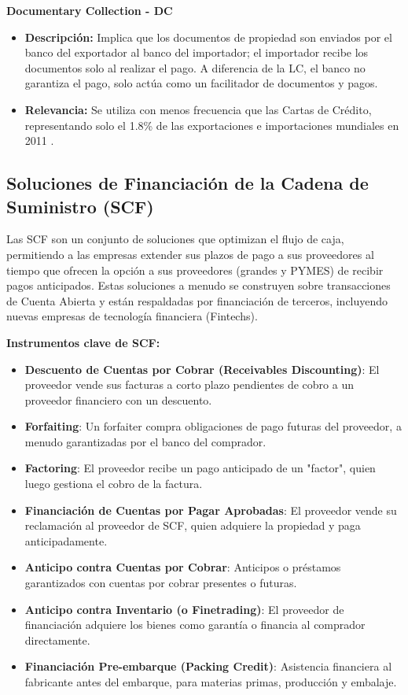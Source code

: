 \documentclass[11pt]{article}
\begin{document}
\textbf{Documentary Collection - DC}
\begin{itemize}
\item \textbf{Descripción:} Implica que los documentos de propiedad son enviados por el banco del exportador al banco del importador; el importador recibe los documentos solo al realizar el pago. A diferencia de la LC, el banco no garantiza el pago, solo actúa como un facilitador de documentos y pagos.

\item \textbf{Relevancia:} Se utiliza con menos frecuencia que las Cartas de Crédito, representando solo el 1.8\% de las exportaciones e importaciones mundiales en 2011 \citet{IMFBAFT2011}. 
\end{itemize}

\subsection{Soluciones de Financiación de la Cadena de Suministro (SCF)}
Las SCF son un conjunto de soluciones que optimizan el flujo de caja, permitiendo a las empresas extender sus plazos de pago a sus proveedores al tiempo que ofrecen la opción a sus proveedores (grandes y PYMES) de recibir pagos anticipados. Estas soluciones a menudo se construyen sobre transacciones de Cuenta Abierta y están respaldadas por financiación de terceros, incluyendo nuevas empresas de tecnología financiera (Fintechs).

\textbf{Instrumentos clave de SCF:}

\begin{itemize}
\item \textbf{Descuento de Cuentas por Cobrar (Receivables Discounting)}: El proveedor vende sus facturas a corto plazo pendientes de cobro a un proveedor financiero con un descuento.

\item \textbf{Forfaiting}: Un forfaiter compra obligaciones de pago futuras del proveedor, a menudo garantizadas por el banco del comprador.

\item \textbf{Factoring}: El proveedor recibe un pago anticipado de un "factor", quien luego gestiona el cobro de la factura.

\item \textbf{Financiación de Cuentas por Pagar Aprobadas}: El proveedor vende su reclamación al proveedor de SCF, quien adquiere la propiedad y paga anticipadamente.

\item \textbf{Anticipo contra Cuentas por Cobrar}: Anticipos o préstamos garantizados con cuentas por cobrar presentes o futuras.

\item \textbf{Anticipo contra Inventario (o Finetrading)}: El proveedor de financiación adquiere los bienes como garantía o financia al comprador directamente.
\item \textbf{Financiación Pre-embarque (Packing Credit)}: Asistencia financiera al fabricante antes del embarque, para materias primas, producción y embalaje.
\end{itemize}
\end{document}
